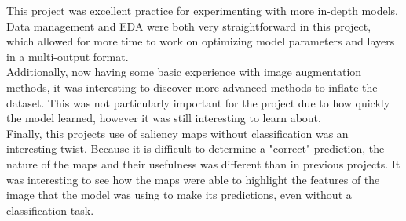 \documentclass{article}[12pt]
\begin{document}
This project was excellent practice for experimenting with more in-depth models. Data management and EDA were both very straightforward in this project, which allowed for more time to work on optimizing model parameters and layers in a multi-output format. \\
\indent
Additionally, now having some basic experience with image augmentation methods, it was interesting to discover more advanced methods to inflate the dataset. This was not particularly important for the project due to how quickly the model learned, however it was still interesting to learn about.\\
\indent
Finally, this projects use of saliency maps without classification was an interesting twist. Because it is difficult to determine a "correct" prediction, the nature of the maps and their usefulness was different than in previous projects. It was interesting to see how the maps were able to highlight the features of the image that the model was using to make its predictions, even without a classification task.\\



\end{document}
